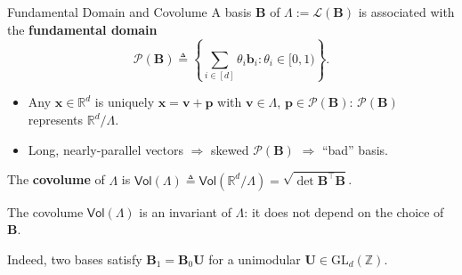 \documentclass{zkdl-presentation-template}
\begin{document}
    \begin{frame}{Fundamental Domain and Covolume}
        A basis $\mathbf{B}$ of $\Lambda := \mathcal{L}(\mathbf{B})$ is associated with the \textbf{fundamental domain}
        \begin{equation*}
            \mathcal{P}(\mathbf{B}) \triangleq \left\{ \sum_{i \in [d]} \theta_i\mathbf{b}_i: \theta_i \in [0,1) \right\}.
        \end{equation*}
        \vspace{-10pt}
        \begin{itemize}
            \item Any $\mathbf{x} \in \mathbb{R}^d$ is uniquely $\mathbf{x} = \mathbf{v} + \mathbf{p}$ with $\mathbf{v} \in \Lambda$, $\mathbf{p} \in \mathcal{P}(\mathbf{B})$: $\mathcal{P}(\mathbf{B})$ represents $\mathbb{R}^d/\Lambda$.
            \item Long, nearly-parallel vectors $\Rightarrow$ skewed $\mathcal{P}(\mathbf{B})$ $\Rightarrow$ ``bad'' basis.
        \end{itemize}
        \pause

        \begin{definition}[Covolume]
            The \textbf{covolume} of $\Lambda$ is $\mathsf{Vol}(\Lambda) \triangleq \mathsf{Vol}(\mathbb{R}^d/\Lambda) = \sqrt{\det \mathbf{B}^{\top}\mathbf{B}}$.
        \end{definition}
        \pause

        \begin{proposition}
            The covolume $\mathsf{Vol}(\Lambda)$ is an invariant of $\Lambda$: it does not depend on the choice of $\mathbf{B}$.
        \end{proposition}
        {\footnotesize Indeed, two bases satisfy $\mathbf{B}_1=\mathbf{B}_0\mathbf{U}$ for a unimodular $\mathbf{U} \in \text{GL}_d(\mathbb{Z})$.}
    \end{frame}
\end{document}
